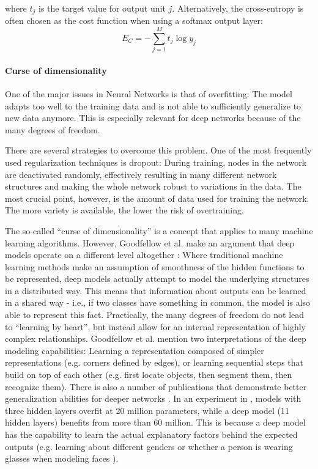             where $t_j$ is the target value for output unit $j$. 
            Alternatively, the cross-entropy is often chosen as the cost function when using a softmax output layer:
            \begin{equation}
                E_C = - \sum_{j=1}^M t_j \log y_j
            \end{equation}

            \paragraph{Curse of dimensionality} One of the major issues in Neural Networks is that of overfitting: 
            The model adapts too well to the training data and is not able to sufficiently generalize to new data anymore. 
            This is especially relevant for deep networks because of the many degrees of freedom.

            There are several strategies to overcome this problem. One of the most frequently used regularization techniques is dropout: 
            During training, nodes in the network are deactivated randomly, effectively resulting in many different network structures and making the whole network robust to variations in the data. 
            The most crucial point, however, is the amount of data used for training the network. 
            The more variety is available, the lower the risk of overtraining.

            The so-called ``curse of dimensionality'' is a concept that applies to many machine learning algorithms. 
            However, Goodfellow et al. make an argument that deep models operate on a different level altogether \cite{goodfellow}: 
            Where traditional machine learning methods make an assumption of smoothness of the hidden functions to be represented, deep models actually attempt to model the underlying structures in a distributed way. 
            This means that information about outputs can be learned in a shared way - i.e., if two classes have something in common, the model is also able to represent this fact. 
            Practically, the many degrees of freedom do not lead to ``learning by heart'', but instead allow for an internal representation of highly complex relationships. 
            Goodfellow et al. mention two interpretations of the deep modeling capabilities: 
            Learning a representation composed of simpler representations (e.g. corners defined by edges), or learning sequential steps that build on top of each other (e.g. first locate objects, then segment them, then recognize them). 
            There is also a number of publications that demonstrate better generalization abilities for deeper networks \cite{bengio07}\cite{bengio09}\cite{ciresan}\cite{erhan09}\cite{krizhevsky}\cite{szegedy}. 
            In an experiment in \cite{goodfellow_experiment}, models with three hidden layers overfit at 20 million parameters, while a deep model (11 hidden layers) benefits from more than 60 million. 
            This is because a deep model has the capability to learn the actual explanatory factors behind the expected outputs (e.g. learning about different genders or whether a person is wearing glasses when modeling faces \cite{radford}).

